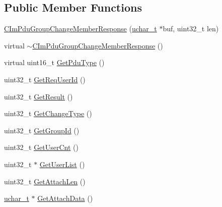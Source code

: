 \subsection*{Public Member Functions}
\begin{DoxyCompactItemize}
\item 
\hyperlink{class_c_im_pdu_group_change_member_response_afb04a232d7f24fc479167cf39b63ab25}{C\+Im\+Pdu\+Group\+Change\+Member\+Response} (\hyperlink{base_2ostype_8h_a124ea0f8f4a23a0a286b5582137f0b8d}{uchar\+\_\+t} $\ast$buf, uint32\+\_\+t len)
\item 
virtual \hyperlink{class_c_im_pdu_group_change_member_response_a46d1e492d3baa0d7672ce4329da24e03}{$\sim$\+C\+Im\+Pdu\+Group\+Change\+Member\+Response} ()
\item 
virtual uint16\+\_\+t \hyperlink{class_c_im_pdu_group_change_member_response_aa0a74ddb0e7e74d5adfe1711aa7b1f84}{Get\+Pdu\+Type} ()
\item 
uint32\+\_\+t \hyperlink{class_c_im_pdu_group_change_member_response_afccf3514ef0fa131c3e8ca3766175e3b}{Get\+Req\+User\+Id} ()
\item 
uint32\+\_\+t \hyperlink{class_c_im_pdu_group_change_member_response_a8fbdd49a1e6aa39b5a0eee6cb0b2362e}{Get\+Result} ()
\item 
uint32\+\_\+t \hyperlink{class_c_im_pdu_group_change_member_response_a67d43847930aeb9847d456307a31fd5b}{Get\+Change\+Type} ()
\item 
uint32\+\_\+t \hyperlink{class_c_im_pdu_group_change_member_response_a31cf8673e108f6e610fd564aa13db848}{Get\+Group\+Id} ()
\item 
uint32\+\_\+t \hyperlink{class_c_im_pdu_group_change_member_response_a2e90ba9553813a352d1651b3be0751be}{Get\+User\+Cnt} ()
\item 
uint32\+\_\+t $\ast$ \hyperlink{class_c_im_pdu_group_change_member_response_a3c7463be33a51d9ed359a13df80e218c}{Get\+User\+List} ()
\item 
uint32\+\_\+t \hyperlink{class_c_im_pdu_group_change_member_response_ac7bce70877009bf6d3c4efd3de6acd21}{Get\+Attach\+Len} ()
\item 
\hyperlink{base_2ostype_8h_a124ea0f8f4a23a0a286b5582137f0b8d}{uchar\+\_\+t} $\ast$ \hyperlink{class_c_im_pdu_group_change_member_response_a8107b89e5a093e190c0394080e77ba73}{Get\+Attach\+Data} ()
\end{DoxyCompactItemize}
